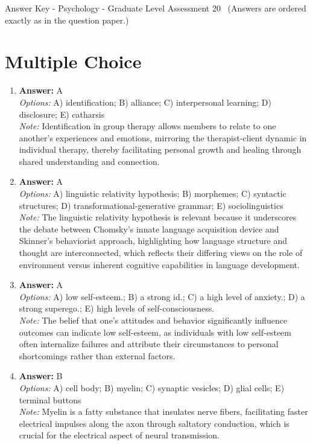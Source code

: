 \documentclass[12pt]{article}
\begin{document}
\begin{center}
Answer Key - Psychology - Graduate Level Assessment 20 \
\small (Answers are ordered exactly as in the question paper.)
\end{center}

\section*{Multiple Choice}
\begin{enumerate}[label=\arabic*.]
\item \textbf{Answer:} A
\\ \textit{Options:} A) identification; B) alliance; C) interpersonal learning; D) disclosure; E) catharsis
\\ \textit{Note:} Identification in group therapy allows members to relate to one another's experiences and emotions, mirroring the therapist-client dynamic in individual therapy, thereby facilitating personal growth and healing through shared understanding and connection.
\item \textbf{Answer:} A
\\ \textit{Options:} A) linguistic relativity hypothesis; B) morphemes; C) syntactic structures; D) transformational-generative grammar; E) sociolinguistics
\\ \textit{Note:} The linguistic relativity hypothesis is relevant because it underscores the debate between Chomsky's innate language acquisition device and Skinner's behaviorist approach, highlighting how language structure and thought are interconnected, which reflects their differing views on the role of environment versus inherent cognitive capabilities in language development.
\item \textbf{Answer:} A
\\ \textit{Options:} A) low self-esteem.; B) a strong id.; C) a high level of anxiety.; D) a strong superego.; E) high levels of self-consciousness.
\\ \textit{Note:} The belief that one's attitudes and behavior significantly influence outcomes can indicate low self-esteem, as individuals with low self-esteem often internalize failures and attribute their circumstances to personal shortcomings rather than external factors.
\item \textbf{Answer:} B
\\ \textit{Options:} A) cell body; B) myelin; C) synaptic vesicles; D) glial cells; E) terminal buttons
\\ \textit{Note:} Myelin is a fatty substance that insulates nerve fibers, facilitating faster electrical impulses along the axon through saltatory conduction, which is crucial for the electrical aspect of neural transmission.

\end{enumerate}
\end{document}
